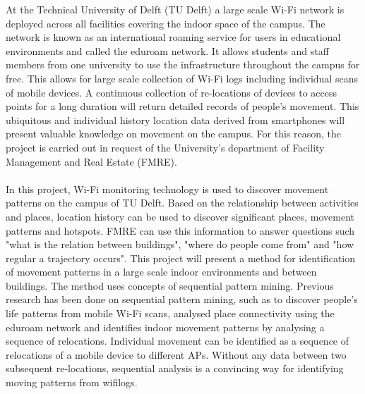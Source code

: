 At the Technical University of Delft (TU Delft) a large scale Wi-Fi network is deployed across all facilities covering the indoor space of the campus. The network is known as an international roaming service for users in educational environments and called the eduroam network. It allows students and staff members from one university to use the infrastructure throughout the campus for free. This allows for large scale collection of Wi-Fi logs including individual scans of mobile devices.  A continuous collection of re-locations of devices to access points for a long duration will return detailed records of people’s movement. This ubiquitous and individual history location data derived from smartphones will present valuable knowledge on movement on the campus. For this reason, the project is carried out in request of the University’s department of Facility Management and Real Estate (FMRE).\\\\
In this project, Wi-Fi monitoring technology is used to discover movement
patterns on the campus of TU Delft. Based on the relationship between activities and places, location history can be used to discover significant places, movement patterns and hotspots. FMRE can use this information to answer questions such "what is the relation between buildings", "where do people come from" and "how regular a trajectory occurs". This project will present a method for identification of movement patterns in a large scale indoor environments and between buildings. The method uses concepts of sequential pattern mining. Previous research has been done on sequential pattern mining, such as \cite{zhao2014discovering} to discover people’s life patterns from mobile Wi-Fi scans, \citep{meneses2012large} analysed place connectivity using the eduroam network and \cite{radaelli2013identifying} identifies indoor movement patterns by analysing a sequence of relocations. Individual movement can be identified as a sequence of relocations of a mobile device to different APs. Without any data between two subsequent re-locations, sequential analysis is a convincing way for identifying moving patterns from wifilogs.\\\\
